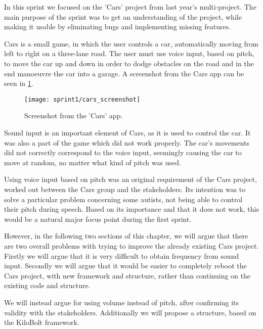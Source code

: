 In this sprint we focused on the 'Cars' project from last year's multi-project.
The main purpose of the sprint was to get an understanding of the project, while making it usable by eliminating bugs and implementing missing features.

Cars is a small game, in which the user controls a car, automatically moving from left to right on a three-lane road.
The user must use voice input, based on pitch, to move the car up and down in order to dodge obstacles on the road and in the end manoeuvre the car into a garage.
A screenshot from the Cars app can be seen in \cref{fig:cars_screenshot}.

\begin{figure}[h]
\centering
\texttt{[image: sprint1/cars\_screenshot]}
\caption{Screenshot from the 'Cars' app.}
\label{fig:cars_screenshot}
\end{figure}

Sound input is an important element of Cars, as it is used to control the car.
It was also a part of the game which did not work properly.
The car's movements did not correctly correspond to the voice input, seemingly causing the car to move at random, no matter what kind of pitch was used.

Using voice input based on pitch was an original requirement of the Cars project, worked out between the Cars group and the stakeholders.
Its intention was to solve a particular problem concerning some autists, not being able to control their pitch during speech.
Based on its importance and that it does not work, this would be a natural major focus point during the first sprint.

However, in the following two sections of this chapter, we will argue that there are two overall problems with trying to improve the already existing Cars project.
Firstly we will argue that it is very difficult to obtain frequency from sound input.
Secondly we will argue that it would be easier to completely reboot the Cars project, with new framework and structure, rather than continuing on the existing code and structure.

We will instead argue for using volume instead of pitch, after confirming its validity with the stakeholders.
Additionally we will propose a structure, based on the KiloBolt framework.